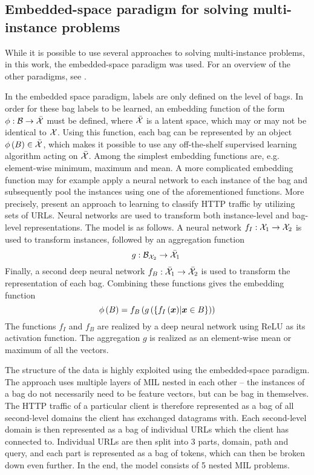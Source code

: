 \subsection{Embedded-space paradigm for solving multi-instance problems}\label{sec:embedded-space-paradigm}
While it is possible to use several approaches to solving multi-instance problems, in this work, the embedded-space paradigm was used. For an overview of the other paradigms, see \cite{dedic_optimalization_2020}.

In the embedded space paradigm, labels are only defined on the level of bags. In order for these bag labels to be learned, an embedding function of the form \( \phi : \mathcal{B} \to \bar{\mathcal{X}} \) must be defined, where \( \bar{\mathcal{X}} \) is a latent space, which may or may not be identical to \( \mathcal{X} \). Using this function, each bag can be represented by an object \( \phi \left( B \right) \in \bar{\mathcal{X}} \), which makes it possible to use any off-the-shelf supervised learning algorithm acting on \( \bar{\mathcal{X}} \). Among the simplest embedding functions are, e.g. element-wise minimum, maximum and mean. A more complicated embedding function may for example apply a neural network to each instance of the bag and subsequently pool the instances using one of the aforementioned functions. More precisely, \cite{pevny_nested_2020} present an approach to learning to classify HTTP traffic by utilizing sets of URLs. Neural networks are used to transform both instance-level and bag-level representations. The model is as follows. A neural network \( f_I : \mathcal{X}_1 \to \mathcal{X}_2 \) is used to transform instances, followed by an aggregation function
\[ g: \mathcal{B}_{\mathcal{X}_2} \to \bar{\mathcal{X}}_1 \ \]
Finally, a second deep neural network \( f_B : \bar{\mathcal{X}}_1 \to \bar{\mathcal{X}}_2 \) is used to transform the representation of each bag. Combining these functions gives the embedding function
\[ \phi \left( B \right) = f_B \left( g \left( \left\{ f_I \left( \bm{x} \right) \middle| \bm{x} \in B \right\} \right) \right) \]
The functions \( f_I \) and \( f_B \) are realized by a deep neural network using ReLU as its activation function. The aggregation \( g \) is realized as an element-wise mean or maximum of all the vectors.

The structure of the data is highly exploited using the embedded-space paradigm. The approach uses multiple layers of MIL nested in each other -- the instances of a bag do not necessarily need to be feature vectors, but can be bag in themselves. The HTTP traffic of a particular client is therefore represented as a bag of all second-level domains the client has exchanged datagrams with. Each second-level domain is then represented as a bag of individual URLs which the client has connected to. Individual URLs are then split into 3 parts, domain, path and query, and each part is represented as a bag of tokens, which can then be broken down even further. In the end, the model consists of 5 nested MIL problems.

